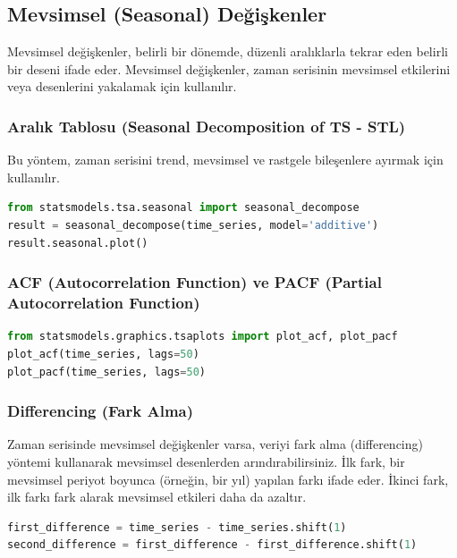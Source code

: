 \newpage

\subsection{Mevsimsel (Seasonal) Değişkenler}

Mevsimsel değişkenler, belirli bir dönemde, düzenli aralıklarla tekrar eden belirli bir deseni ifade eder. Mevsimsel değişkenler, zaman serisinin mevsimsel etkilerini veya desenlerini yakalamak için kullanılır.\\

\subsubsection{Aralık Tablosu (Seasonal Decomposition of TS - STL)}

Bu yöntem, zaman serisini trend, mevsimsel ve rastgele bileşenlere ayırmak için kullanılır.

\begin{lstlisting}[language=Python]
from statsmodels.tsa.seasonal import seasonal_decompose
result = seasonal_decompose(time_series, model='additive')
result.seasonal.plot()
\end{lstlisting}

\subsubsection{ACF (Autocorrelation Function) ve PACF (Partial Autocorrelation Function)}

\begin{lstlisting}[language=Python]
from statsmodels.graphics.tsaplots import plot_acf, plot_pacf
plot_acf(time_series, lags=50)
plot_pacf(time_series, lags=50)
\end{lstlisting}

\subsubsection{Differencing (Fark Alma)}

Zaman serisinde mevsimsel değişkenler varsa, veriyi fark alma (differencing) yöntemi kullanarak mevsimsel desenlerden arındırabilirsiniz. İlk fark, bir mevsimsel periyot boyunca (örneğin, bir yıl) yapılan farkı ifade eder. İkinci fark, ilk farkı fark alarak mevsimsel etkileri daha da azaltır.

\begin{lstlisting}[language=Python]
first_difference = time_series - time_series.shift(1)
second_difference = first_difference - first_difference.shift(1)
\end{lstlisting}

